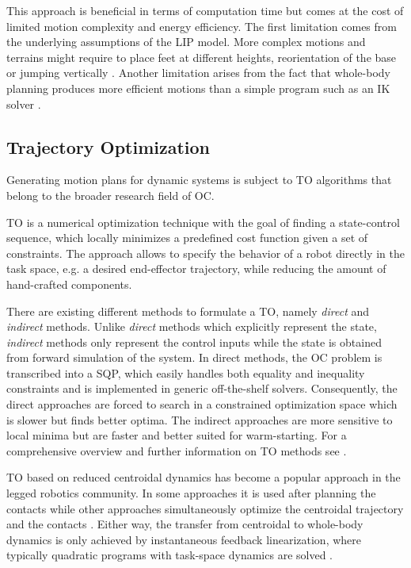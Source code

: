 This approach is beneficial in terms of computation time but comes at the cost of limited motion complexity and energy efficiency. 
The first limitation comes from the underlying assumptions of the \gls{LIP} model. More complex motions and terrains might require to place feet at different heights, reorientation of the base or jumping vertically \cite{winkler2018optimization}. Another limitation arises from the fact that whole-body planning produces more efficient motions than a simple program such as an \gls{IK} solver \cite{budhiraja2018differential}.   

\subsection{Trajectory Optimization}
Generating motion plans for dynamic systems is subject to \gls{TO} algorithms that belong to the broader research field of \gls{OC}. 

\gls{TO} is a numerical optimization technique with the goal of finding a state-control sequence, which locally minimizes a predefined cost function given a set of constraints. The approach allows to specify the behavior of a robot directly in the task space, e.g. a desired end-effector trajectory, while reducing the amount of hand-crafted components. 

There are existing different methods to formulate a \gls{TO}, namely \textit{direct} and \textit{indirect} methods. Unlike \textit{direct} methods which explicitly represent the state, \textit{indirect} methods only represent the control inputs while the state is obtained from forward simulation of the system. In direct methods, the \gls{OC} problem is transcribed into a \gls{SQP}, which easily handles both equality and inequality constraints and is implemented in generic off-the-shelf solvers. Consequently, the direct approaches are forced to search in a constrained optimization space which is slower but finds better optima. The indirect approaches are more sensitive to local minima but are faster and better suited for warm-starting. For a comprehensive overview and further information on \gls{TO} methods see \cite{betts1998survey, kelly2017transcription, tassa2014control}.

\gls{TO} based on reduced centroidal dynamics \cite{orin2013centroidal} has become a popular approach in the legged robotics community. In some approaches it is used after planning the contacts \cite{dai2014whole, carpentier2016versatile, herzog2015trajectory} while other approaches simultaneously optimize the centroidal trajectory and the contacts \cite{mastalli2017trajectory, winkler2018gait, aceituno2017simultaneous}. Either way, the transfer from centroidal to whole-body dynamics is only achieved by instantaneous feedback linearization, where typically quadratic programs with task-space dynamics are solved \cite{saab2013dynamic, herzog2016momentum, vaillant2016multi}. 

